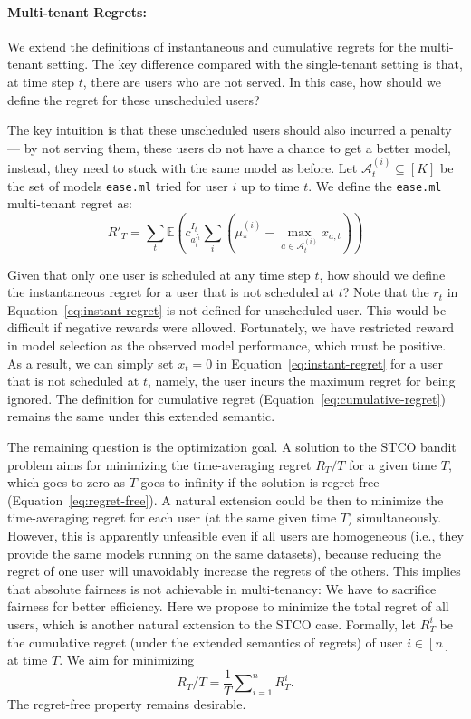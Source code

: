 \documentclass[letterpaper]{vldb}
\newcommand{\eml}{\texttt{ease.ml}\xspace}
\newcommand{\cA}{\mathcal{A}}
\begin{document}
\vspace{-0.5em}
\paragraph*{Multi-tenant Regrets:} 
We extend the definitions of instantaneous and cumulative 
regrets for the multi-tenant setting. The key difference
compared with the single-tenant setting is that,
at time step $t$, there are users who are not
served. In this case, how should we define
the regret for these unscheduled users?

The key intuition is that these unscheduled users should
also incurred a penalty --- by not serving them,
these users do not have a chance to
get a better model, instead, they need to stuck
with the same model as before. Let $\cA_t^{(i)} \subseteq [K]$
be the set of models \eml tried for user $i$
up to time $t$. We define the \eml multi-tenant
regret as:
\[
R'_T = \sum_{t} \mathbb{E}\left(c^{I_t}_{a_t^{I_t}}\sum_{i} \left(\mu^{(i)}_* -  \max_{a\in \mathcal{A}_t^{(i)}}x_{a, t}\right)\right)
\]


Given that only one user is scheduled at any time step $t$, how should we define the instantaneous regret for a user that is not scheduled at $t$?
Note that the $r_t$ in Equation~\ref{eq:instant-regret} is not defined for unscheduled user.
This would be difficult if negative rewards were allowed.
Fortunately, we have restricted reward in model selection as the observed model performance, which must be positive.
As a result, we can simply set $x_t=0$ in Equation~\ref{eq:instant-regret} for a user that is not scheduled at $t$, namely, the user incurs the maximum regret for being ignored.
The definition for cumulative regret (Equation~\ref{eq:cumulative-regret}) remains the same under this extended semantic.

The remaining question is the optimization goal.
A solution to the STCO bandit problem aims for minimizing the time-averaging regret $R_T/T$ for a given time $T$, which goes to zero as $T$ goes to infinity if the solution is regret-free (Equation~\ref{eq:regret-free}).
A natural extension could be then to minimize the time-averaging regret for each user (at the same given time $T$) simultaneously.
However, this is apparently unfeasible even if all users are homogeneous (i.e., they provide the same models running on the same datasets), because reducing the regret of one user will unavoidably increase the regrets of the others.
This implies that absolute fairness is not achievable in multi-tenancy: We have to sacrifice fairness for better efficiency.
Here we propose to minimize the total regret of all users, which is another natural extension to the STCO case.
Formally, let $R_T^i$ be the cumulative regret (under the extended semantics of regrets) of user $i\in[n]$ at time $T$.
We aim for minimizing
\begin{equation}\label{eq:time-avg-regret}
R_T/T=\frac{1}{T}\sum\nolimits_{i=1}^n R_T^i.
\end{equation}
The regret-free property remains desirable.
\end{document}
